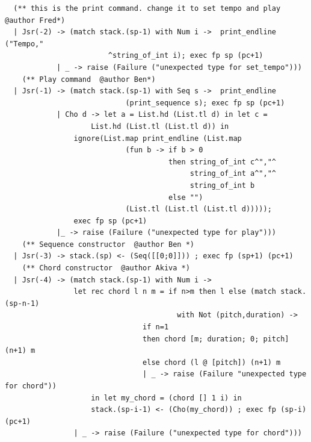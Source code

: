 \documentclass[12pt,A4]{book}
\begin{document}
\begin{verbatim}
  (** this is the print command. change it to set tempo and play  @author Fred*)
  | Jsr(-2) -> (match stack.(sp-1) with Num i ->  print_endline ("Tempo,"
                        ^string_of_int i); exec fp sp (pc+1)
            | _ -> raise (Failure ("unexpected type for set_tempo")))
    (** Play command  @author Ben*)
  | Jsr(-1) -> (match stack.(sp-1) with Seq s ->  print_endline
                            (print_sequence s); exec fp sp (pc+1)
            | Cho d -> let a = List.hd (List.tl d) in let c = 
                    List.hd (List.tl (List.tl d)) in
                ignore(List.map print_endline (List.map 
                            (fun b -> if b > 0 
                                      then string_of_int c^","^
                                           string_of_int a^","^
                                           string_of_int b 
                                      else "") 
                            (List.tl (List.tl (List.tl d)))));
                exec fp sp (pc+1)
            |_ -> raise (Failure ("unexpected type for play")))
    (** Sequence constructor  @author Ben *)
  | Jsr(-3) -> stack.(sp) <- (Seq([[0;0]])) ; exec fp (sp+1) (pc+1)
    (** Chord constructor  @author Akiva *)
  | Jsr(-4) -> (match stack.(sp-1) with Num i ->
                let rec chord l n m = if n>m then l else (match stack.(sp-n-1) 
                                        with Not (pitch,duration) ->
                                if n=1 
                                then chord [m; duration; 0; pitch] (n+1) m 
                                else chord (l @ [pitch]) (n+1) m
                                | _ -> raise (Failure "unexpected type for chord"))
                    in let my_chord = (chord [] 1 i) in
                    stack.(sp-i-1) <- (Cho(my_chord)) ; exec fp (sp-i) (pc+1)
                | _ -> raise (Failure ("unexpected type for chord")))


\end{verbatim}
\end{document}
